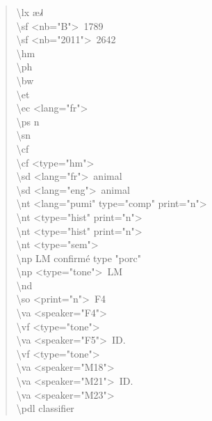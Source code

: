 \documentclass[a4paper,12pt]{article}
\newcommand{\ipa}[1]{{\phon #1}}
\begin{document}
\begin{quote}
\textbackslash lx \ipa{æ˩˧} \\
\textbackslash sf \textless nb="B"\textgreater~1789 \\
\textbackslash sf \textless nb="2011"\textgreater~2642 \\
\textbackslash hm \\
\textbackslash ph \\
\textbackslash bw \\
\textbackslash et \\
\textbackslash ec \textless lang="fr"\textgreater \\
\textbackslash ps n \\
\textbackslash sn \\
\textbackslash cf \\
\textbackslash cf \textless type="hm"\textgreater \\ 
\textbackslash sd \textless lang="fr"\textgreater~animal \\
\textbackslash sd \textless lang="eng"\textgreater~animal \\
\textbackslash nt \textless lang="pumi" type="comp" print="n"\textgreater \\
\textbackslash nt \textless type="hist" print="n"\textgreater \\
\textbackslash nt \textless type="hist" print="n"\textgreater \\
\textbackslash nt \textless type="sem"\textgreater \\
\textbackslash np LM confirmé type "porc" \\
\textbackslash np \textless type="tone"\textgreater~LM \\
\textbackslash nd \\
\textbackslash so \textless print="n"\textgreater~F4 \\
\textbackslash va \textless speaker="F4"\textgreater \\
\textbackslash vf \textless type="tone"\textgreater \\
\textbackslash va \textless speaker="F5"\textgreater~ID. \\
\textbackslash vf \textless type="tone"\textgreater \\
\textbackslash va \textless speaker="M18"\textgreater \\
\textbackslash va \textless speaker="M21"\textgreater~ID. \\
\textbackslash va \textless speaker="M23"\textgreater \\
\textbackslash pdl classifier \\

\end{quote}
\end{document}
